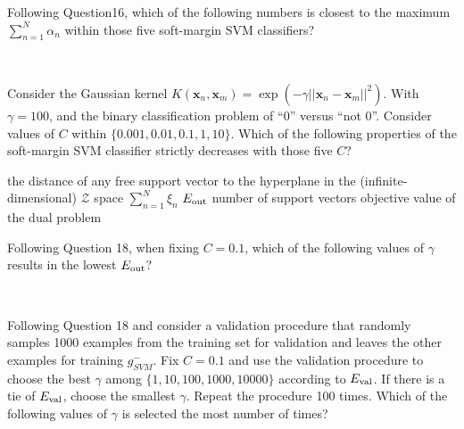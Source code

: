 \documentclass[a4paper,10pt]{exam}
\begin{document}
\begin{questions}
  \question Following Question16, which of the following numbers is closest to the maximum $\sum_{n=1}^N \alpha_n$ within those five soft-margin SVM classifiers?
  \begin{checkboxes}
    \\	
  \end{checkboxes}
  
  \question Consider the Gaussian kernel $K(\mathbf{x}_n,\mathbf{x}_m)= \exp\left(-\gamma ||\mathbf{x}_n - \mathbf{x}_m||^2 \right)$. With $\gamma = 100$, and the binary classification problem of ``0'' versus ``not 0''. Consider values of $C$ within $\{0.001, 0.01, 0.1, 1, 10\}$. Which of the following properties of the soft-margin SVM classifier strictly decreases with those five $C$?
  \begin{checkboxes}
  	\CorrectChoice the distance of any free support vector to the hyperplane in the (infinite-dimensional) $\mathcal{Z}$ space
  	\CorrectChoice $\sum_{n=1}^N \xi_n$
  	\choice $E_{\rm out}$
  	\choice number of support vectors
  	\CorrectChoice objective value of the dual problem\\ 	
  \end{checkboxes}
  
  \question Following Question 18, when fixing $C=0.1$, which of the following values of $\gamma$ results in the lowest $E_{\rm out}$?
  \begin{checkboxes}
  	\\
  \end{checkboxes}
  
  \question Following Question 18 and consider a validation procedure that randomly samples 1000 examples from the training set for validation and leaves the other examples for training $g^{-}_{SVM}$. Fix $C=0.1$ and use the validation procedure to choose the best $\gamma$ among $\{1, 10, 100, 1000, 10000\}$ according to $E_{\rm val}$. If there is a tie of $E_{\rm val}$, choose the smallest $\gamma$. Repeat the procedure 100 times. Which of the following values of $\gamma$ is selected the most number of times?
  
  \begin{checkboxes}
  	\\
  \end{checkboxes}
\end{questions}
\clearpage 
\end{document}
